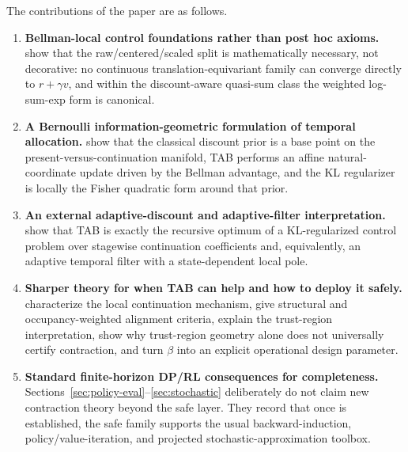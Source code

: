 \documentclass{article}
\theoremstyle{remark}
\begin{document}
The contributions of the paper are as follows.
\begin{enumerate}[leftmargin=1.5em,itemsep=2pt]
    \item \textbf{Bellman-local control foundations rather than post hoc axioms.}
     show that the raw/centered/scaled split is mathematically necessary, not decorative: no continuous translation-equivariant family can converge directly to $r+\gamma v$, and within the discount-aware quasi-sum class the weighted log-sum-exp form is canonical.
    \item \textbf{A Bernoulli information-geometric formulation of temporal allocation.}
     show that the classical discount prior is a base point on the present-versus-continuation manifold, TAB performs an affine natural-coordinate update driven by the Bellman advantage, and the KL regularizer is locally the Fisher quadratic form around that prior.
    \item \textbf{An external adaptive-discount and adaptive-filter interpretation.}
     show that TAB is exactly the recursive optimum of a KL-regularized control problem over stagewise continuation coefficients and, equivalently, an adaptive temporal filter with a state-dependent local pole.
    \item \textbf{Sharper theory for when TAB can help and how to deploy it safely.}
     characterize the local continuation mechanism, give structural and occupancy-weighted alignment criteria, explain the trust-region interpretation, show why trust-region geometry alone does not universally certify contraction, and turn $\beta$ into an explicit operational design parameter.
    \item \textbf{Standard finite-horizon DP/RL consequences for completeness.}
    Sections~\ref{sec:policy-eval}--\ref{sec:stochastic} deliberately do not claim new contraction theory beyond the safe layer. They record that once  is established, the safe family supports the usual backward-induction, policy/value-iteration, and projected stochastic-approximation toolbox.
\end{enumerate}
\end{document}
